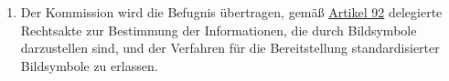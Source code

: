 \begin{enumerate}
  \item Der Kommission wird die Befugnis übertragen, gemäß \hyperref[ch:92]{Artikel 92} delegierte Rechtsakte zur
   Bestimmung der Informationen, die durch Bildsymbole darzustellen sind, und der Verfahren für die Bereitstellung
   standardisierter Bildsymbole zu erlassen.%
  \label{itm:12-8}

\end{enumerate}


